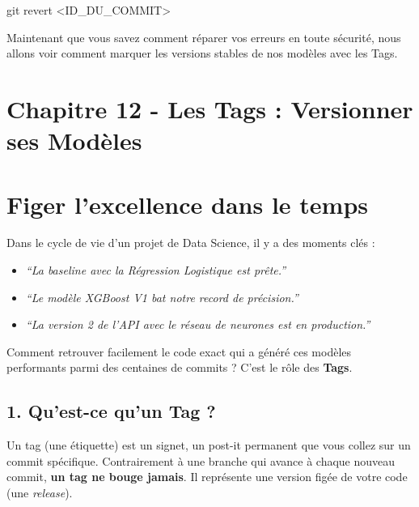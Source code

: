 \documentclass[
  letterpaper,
  DIV=11,
  numbers=noendperiod]{scrreprt}
\newenvironment{Shaded}{\begin{snugshade}}{\end{snugshade}}
\newcommand{\FunctionTok}[1]{\textcolor[rgb]{0.28,0.35,0.67}{#1}}
\newcommand{\NormalTok}[1]{\textcolor[rgb]{0.00,0.23,0.31}{#1}}
\newcommand{\OperatorTok}[1]{\textcolor[rgb]{0.37,0.37,0.37}{#1}}
\begin{document}
\begin{Shaded}
\begin{Highlighting}[]
\FunctionTok{git}\NormalTok{ revert }\OperatorTok{\textless{}}\NormalTok{ID\_DU\_COMMIT}\OperatorTok{\textgreater{}}
\end{Highlighting}
\end{Shaded}

Maintenant que vous savez comment réparer vos erreurs en toute sécurité,
nous allons voir comment marquer les versions stables de nos modèles
avec les Tags.


\section{Chapitre 12 - Les Tags : Versionner ses
Modèles}\label{chapitre-12---les-tags-versionner-ses-moduxe8les}


\section{Figer l'excellence dans le
temps}\label{figer-lexcellence-dans-le-temps}

Dans le cycle de vie d'un projet de Data Science, il y a des moments
clés :

\begin{itemize}
\item
  \emph{``La baseline avec la Régression Logistique est prête.''}
\item
  \emph{``Le modèle XGBoost V1 bat notre record de précision.''}
\item
  \emph{``La version 2 de l'API avec le réseau de neurones est en
  production.''}
\end{itemize}

Comment retrouver facilement le code exact qui a généré ces modèles
performants parmi des centaines de commits ? C'est le rôle des
\textbf{Tags}.

\subsection{1. Qu'est-ce qu'un Tag ?}\label{quest-ce-quun-tag}

Un tag (une étiquette) est un signet, un post-it permanent que vous
collez sur un commit spécifique. Contrairement à une branche qui avance
à chaque nouveau commit, \textbf{un tag ne bouge jamais}. Il représente
une version figée de votre code (une \emph{release}).
\end{document}
